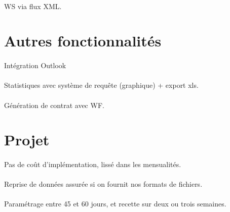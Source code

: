 \paragraph{} WS via flux XML.
 


\section{Autres fonctionnalités}
\paragraph{} Intégration Outlook
\paragraph{} Statistiques avec système de requête (graphique) + export xls.
\paragraph{} Génération de contrat avec WF.


\section{Projet} 
\paragraph{} Pas de coût d'implémentation, lissé dans les mensualités.
\paragraph{} Reprise de données assurée si on fournit nos formats de fichiers.
\paragraph{} Paramétrage entre 45 et 60 jours, et recette sur deux ou trois semaines.

